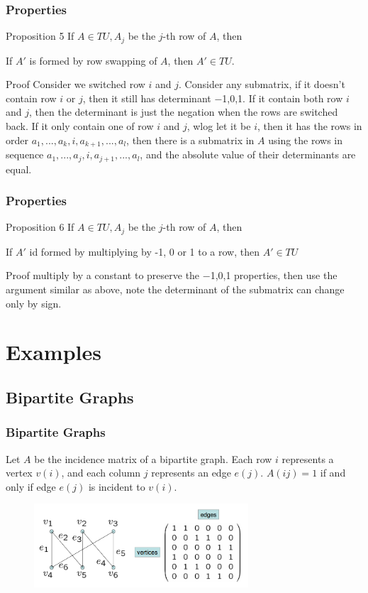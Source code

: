 \documentclass{beamer}
\begin{document}
\begin{frame}\frametitle{Properties}
\begin{block}{Proposition 5}
If $A \in TU, A_j$ be the $j$-th row of $A$, then \\
\centerline{If $A'$ is formed by row swapping of $A$, then $A' \in TU.$}
\end{block}
\begin{block}{Proof}
Consider we switched row $i$ and $j$. Consider any submatrix, if it doesn't contain row $i$ or $j$, then it still has determinant −1,0,1. If it contain both row $i$ and $j$, then the determinant is just the negation when the rows are switched back. If it only contain one of row $i$ and $j$, wlog let it be $i$, then it has the rows in order $a_1, ..., a_k, i, a_{k+1}, ..., a_l$, then there is a submatrix in $A$ using the rows in sequence $a_1, ..., a_j, i, a_{j+1}, ..., a_l$, and the absolute value of their determinants are equal.
\end{block}
\end{frame}

\begin{frame}\frametitle{Properties}
\begin{block}{Proposition 6}
If $A \in TU, A_j$ be the $j$-th row of $A$, then \\
\centerline{If $A'$ id formed by multiplying by -1, 0 or 1 to a row, then $A' \in TU$}
\end{block}
\begin{block}{Proof}
multiply by a constant to preserve the −1,0,1 properties, then use the argument similar as above, note the determinant of the submatrix can change only by sign.
\end{block}
\end{frame}

\section{Examples}
\subsection{Bipartite Graphs}
\begin{frame}\frametitle{Bipartite Graphs}
\begin{block}{}
Let $A$ be the incidence matrix of a bipartite graph. Each row $i$ represents a vertex $v(i)$, and each column $j$ represents an edge $e(j)$. $A(ij) = 1$ if and only if edge $e(j)$ is incident to $v(i)$.
\begin{figure}[h]
\includegraphics[width=8cm]{picture1}
\end{figure}
\end{block}
\end{frame}
\end{document}
